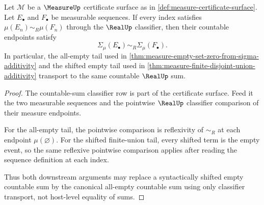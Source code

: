 \begin{theorem}
\label{thm:measure-obligation-countable-sum-classifier-stability}
Let $\mathcal{M}$ be a $\MeasureUp$ certificate surface as in \autoref{def:measure-certificate-surface}. Let $E_\bullet$ and $F_\bullet$ be measurable sequences. If every index satisfies $\mu(E_n)\sim_R\mu(F_n)$ through the $\RealUp$ classifier, then their countable endpoints satisfy
$$
\Sigma_\mu(E_\bullet)\sim_R\Sigma_\mu(F_\bullet).
$$
In particular, the all-empty tail used in \autoref{thm:measure-empty-set-zero-from-sigma-additivity} and the shifted empty tail used in \autoref{thm:measure-finite-disjoint-union-additivity} transport to the same countable $\RealUp$ sum.
\end{theorem}
\begin{proof}
The countable-sum classifier row is part of the certificate surface. Feed it the two measurable sequences and the pointwise $\RealUp$ classifier comparison of their measure endpoints.

For the all-empty tail, the pointwise comparison is reflexivity of $\sim_R$ at each endpoint $\mu(\varnothing)$. For the shifted finite-union tail, every shifted term is the empty event, so the same reflexive pointwise comparison applies after reading the sequence definition at each index.

Thus both downstream arguments may replace a syntactically shifted empty countable sum by the canonical all-empty countable sum using only classifier transport, not host-level equality of sums.
\end{proof}

